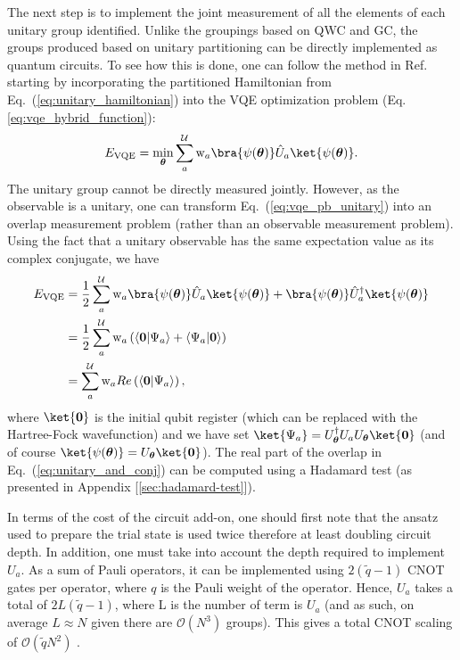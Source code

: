 The next step is to implement the joint measurement of all the elements of each unitary group identified. Unlike the groupings based on QWC and GC, the groups produced based on unitary partitioning can be directly implemented as quantum circuits. To see how this is done, one can follow the method in Ref. \cite{Izmaylov2020a} starting by incorporating the partitioned Hamiltonian from Eq.~(\ref{eq:unitary_hamiltonian}) into the VQE optimization problem (Eq. \ref{eq:vqe_hybrid_function}):
\begin{equation} \label{eq:vqe_pb_unitary}
    E_{\mathrm{VQE}} = \min_{\boldsymbol{\theta}} \sum_a^{\mathcal{U}} \mathrm{w}_a \bra{\psi(\boldsymbol{\theta})} \hat{U}_{a} \ket{\psi(\boldsymbol{\theta})}.
\end{equation}
The unitary group cannot be directly measured jointly. However, as the observable is a unitary, one can transform Eq.~(\ref{eq:vqe_pb_unitary}) into an overlap measurement problem (rather than an observable measurement problem). Using the fact that a unitary observable has the same expectation value as its complex conjugate, we have
\begin{align} \label{eq:unitary_and_conj}
    E_{\mathrm{VQE}} &= \frac{1}{2} \sum_a^{\mathcal{U}} \mathrm{w}_a \bra{\psi(\boldsymbol{\theta})} \hat{U}_{a} \ket{\psi(\boldsymbol{\theta})} + \bra{\psi(\boldsymbol{\theta})} \hat{U}_{a}^{\dagger} \ket{\psi(\boldsymbol{\theta})} \nonumber \\
    & = \frac{1}{2} \sum_a^{\mathcal{U}} \mathrm{w}_a \left( \langle \boldsymbol{0} | \Psi_a \rangle + \langle \Psi_a | \boldsymbol{0} \rangle \right) \nonumber \\
    & = \sum_a^{\mathcal{U}} \mathrm{w}_a Re\left( \langle \boldsymbol{0} | \Psi_a \rangle \right), 
\end{align}
where $\ket{\boldsymbol{0}}$ is the initial qubit register (which can be replaced with the Hartree-Fock wavefunction) and we have set $\ket{\Psi_a} = U_{\boldsymbol{\theta}}^{\dagger} U_a   U_{\boldsymbol{\theta}} \ket{\boldsymbol{0}}$ (and of course $\ket{\psi(\boldsymbol{\theta})} = U_{\boldsymbol{\theta}} \ket{\boldsymbol{0}}$). The real part of the overlap in Eq.~(\ref{eq:unitary_and_conj}) can be computed using a Hadamard test (as presented in Appendix [\ref{sec:hadamard-test}]). 

In terms of the cost of the circuit add-on, one should first note that the ansatz used to prepare the trial state is used twice therefore at least doubling circuit depth. In addition, one must take into account the depth required to implement $U_a$. As a sum of Pauli operators, it can be implemented using $2(\tilde{q} - 1)$ CNOT gates per operator, where $q$ is the Pauli weight of the operator. Hence, $U_a$ takes a total of $2L(\tilde{q} - 1)$, where L is the number of term is $U_a$ (and as such, on average $L \approx N$ given there are $\mathcal{O}(N^3)$ groups). This gives a total CNOT scaling of $\mathcal{O}(\tilde{q}N^2)$ \cite{Izmaylov2020a}. 
 
